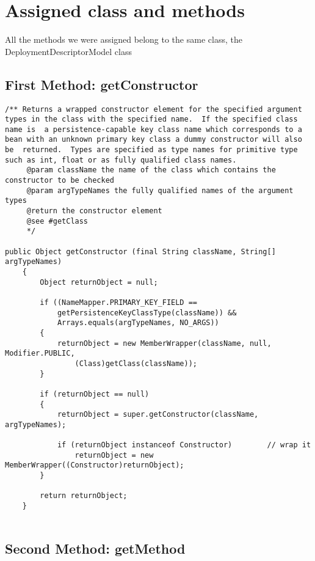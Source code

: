 \section{Assigned class and methods}
All the methods we were assigned belong to the same class, the DeploymentDescriptorModel class

\subsection{First Method: getConstructor}

\begin{lstlisting}	
/** Returns a wrapped constructor element for the specified argument types in the class with the specified name.  If the specified class name is  a persistence-capable key class name which corresponds to a bean with an unknown primary key class a dummy constructor will also be  returned.  Types are specified as type names for primitive type such as int, float or as fully qualified class names. 
	 @param className the name of the class which contains the constructor to be checked
 	 @param argTypeNames the fully qualified names of the argument types 
	 @return the constructor element 
	 @see #getClass
	 */

public Object getConstructor (final String className, String[] argTypeNames)
	{
		Object returnObject = null;

		if ((NameMapper.PRIMARY_KEY_FIELD == 
			getPersistenceKeyClassType(className)) && 
			Arrays.equals(argTypeNames, NO_ARGS))
		{
			returnObject = new MemberWrapper(className, null, Modifier.PUBLIC, 
				(Class)getClass(className));
		}

		if (returnObject == null)
		{
			returnObject = super.getConstructor(className, argTypeNames);

			if (returnObject instanceof Constructor)		// wrap it
				returnObject = new MemberWrapper((Constructor)returnObject);
		}

		return returnObject;
	}
	
\end{lstlisting}
	
	
\newpage
\subsection{Second Method: getMethod} 

